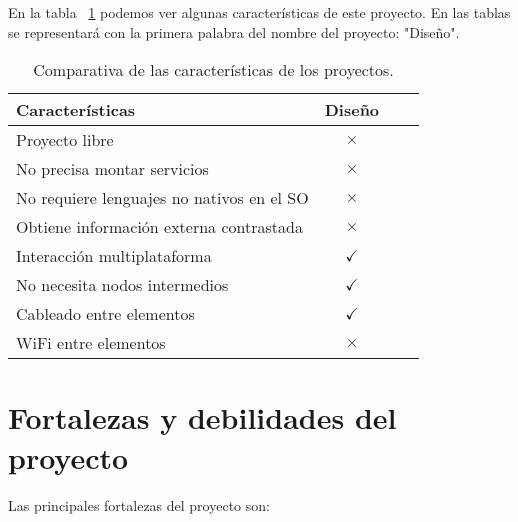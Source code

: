 En la tabla ~\ref{tabla_Diseño} podemos ver algunas características de este proyecto.
En las tablas se representará con la primera palabra del nombre del proyecto: "Diseño".
\begin{table}[H]
\centering
\begin{tabular}{lccc}
\toprule
Características & Diseño  \\
\midrule
Proyecto libre                          & \cellcolor{red!25} {$\times$} \\
No precisa montar servicios             & \cellcolor{red!25} {$\times$} \\
No requiere lenguajes no nativos en el SO  & \cellcolor{red!25} {$\times$} \\
Obtiene información externa contrastada & \cellcolor{red!25} {$\times$} \\
Interacción multiplataforma             & \cellcolor{green!25} {$\checkmark$} \\
No necesita nodos intermedios           & \cellcolor{green!25} {$\checkmark$} \\
Cableado entre elementos                & \cellcolor{green!25} {$\checkmark$} \\
WiFi entre elementos                    & \cellcolor{red!25} {$\times$} \\
\bottomrule
\end{tabular}
\caption{Comparativa de las características de los proyectos.}
\label{tabla_Diseño}
\end{table}

\section{Fortalezas y debilidades del proyecto}

Las principales fortalezas del proyecto son:

